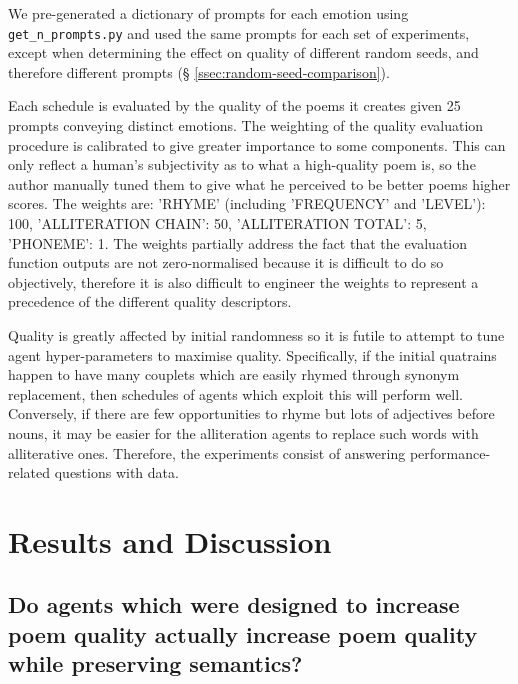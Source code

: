 \documentclass[a4paper,10pt]{article}
\begin{document}
We pre-generated a dictionary of prompts for each emotion using \texttt{get\_n\_prompts.py} and used the same prompts for each set of experiments, except when determining the effect on quality of different random seeds, and therefore different prompts (§ \ref{ssec:random-seed-comparison}).

Each schedule is evaluated by the quality of the poems it creates given 25 prompts conveying distinct emotions. The weighting of the quality evaluation procedure is calibrated to give greater importance to some components. This can only reflect a human's subjectivity as to what a high-quality poem is, so the author manually tuned them to give what he perceived to be better poems higher scores. The weights are: 'RHYME' (including 'FREQUENCY' and 'LEVEL'): 100, 'ALLITERATION CHAIN': 50, 'ALLITERATION TOTAL': 5, 'PHONEME': 1. The weights partially address the fact that the evaluation function outputs are not zero-normalised because it is difficult to do so objectively, therefore it is also difficult to engineer the weights to represent a precedence of the different quality descriptors.

Quality is greatly affected by initial randomness so it is futile to attempt to tune agent hyper-parameters to maximise quality. Specifically, if the initial quatrains happen to have many couplets which are easily rhymed through synonym replacement, then schedules of agents which exploit this will perform well. Conversely, if there are few opportunities to rhyme but lots of adjectives before nouns, it may be easier for the alliteration agents to replace such words with alliterative ones. Therefore, the experiments consist of answering performance-related questions with data.

\section{Results and Discussion}
\label{discussion}

\subsection{Do agents which were designed to increase poem quality actually increase poem quality while preserving semantics?}
\label{label:baseline-quality-increase}
\end{document}
